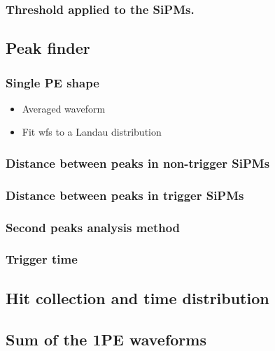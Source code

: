 \documentclass[11pt,a4paper,english,oneside, pdf]{article}
\begin{document}
	\subsubsection{Threshold applied to the SiPMs.}
	
	
	\subsection{Peak finder}
	\label{peak_finder_sec}
	
	\subsubsection{Single PE shape}
	\begin{itemize}
		\item Averaged waveform
		\item Fit wfs to a Landau distribution
	\end{itemize}
	
	\subsubsection{Distance between peaks in non-trigger SiPMs}

	\subsubsection{Distance between peaks in trigger SiPMs}	
	
	\subsubsection{Second peaks analysis method}
	
	\subsubsection{Trigger time}
	
	\subsection{Hit collection and time distribution}
	\label{hits_sec}
	
	
	
	\subsection{Sum of the 1PE waveforms}
	\label{sum_wfs_sec}
	
	
	
\end{document}

